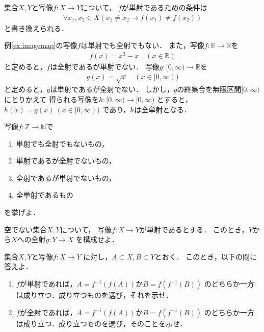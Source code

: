     集合$X,  Y$と写像$f: X \longrightarrow Y$について，
    $f$が単射であるための条件は
    \begin{align} 
      \forall x_1 , x_2 \in X( x_1 \neq x_2 \to f(x_1) \neq f(x_2))
      \label{eq:injectiontaigu}
    \end{align}
    と書き換えられる．
    \begin{ex} \label{ex:mapjection}
      例\ref{ex:imagemap}の写像$f$は単射でも全射でもない．
      また，写像$f : \mathbb{R} \longrightarrow \mathbb{R}$を
      \begin{align*}
        f(x) = x^3 - x \quad ( x \in \mathbb{R} )
      \end{align*}
      と定めると，$f$は全射であるが単射でない．
      写像$g: [0, \infty ) \longrightarrow \mathbb{R}$を
      \begin{align*}
        g(x) = \sqrt{x} \quad ( x \in [0, \infty) )
      \end{align*}
      と定めると，$g$は単射であるが全射でない．
      しかし，$g$の終集合を無限区間$[0, \infty )$にとりかえて
      得られる写像を$h: [0, \infty) \longrightarrow [0, \infty)$
      とすると，$h(x) = g(x) \ ( x \in [0, \infty))$
      であり，$h$は全単射となる．
    \end{ex}
    
    \begin{que} \label{que:ZNmapex}
      写像$f: \mathbb{Z} \longrightarrow \mathbb{N}$で
      \begin{enumerate}[(1) ]
        \item 単射でも全射でもないもの，
        \item 単射であるが全射でないもの，
        \item 全射であるが単射でないもの，
        \item 全単射であるもの
      \end{enumerate}
      を挙げよ．
    \end{que}

    \begin{que} \label{que:injecsurjec}
      空でない集合$X,  Y$について，
      写像$f: X \longrightarrow Y$が単射であるとする．
      このとき，$Y$から$X$への全射$g: Y \longrightarrow X$
      を構成せよ．
    \end{que}

    \begin{que} \label{que:injecsurjecsubset}
      集合$X,  Y$と写像$f: X \longrightarrow Y$
      に対し，$A \subset X,  B \subset Y$とおく．
      このとき，以下の問に答えよ．
      \begin{enumerate}[(1) ]
        \item $f$が単射であれば，$A = f^{-1}(f(A))$か$B = f(f^{-1}(B))$
          のどちらか一方は成り立つ．成り立つものを選び，それを示せ．
        \item $f$が全射であれば，$A = f^{-1}(f(A))$か$B=f(f^{-1}(B))$
          のどちらか一方は成り立つ．成り立つものを選び，そのことを示せ．
      \end{enumerate}
    \end{que}

